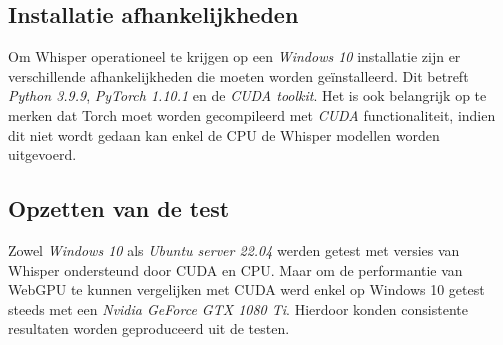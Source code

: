 \bigbreak{}

\subsection*{Installatie afhankelijkheden}

Om Whisper operationeel te krijgen op een \textit{Windows 10} installatie zijn er verschillende afhankelijkheden die moeten worden geïnstalleerd. Dit betreft \textit{Python 3.9.9}, \textit{PyTorch 1.10.1} en de \textit{CUDA toolkit}. Het is ook belangrijk op te merken dat Torch moet worden gecompileerd met \textit{CUDA} functionaliteit, indien dit niet wordt gedaan kan enkel de CPU de Whisper modellen worden uitgevoerd.

\subsection*{Opzetten van de test}

Zowel \textit{Windows 10} als \textit{Ubuntu server 22.04} werden getest met versies van Whisper ondersteund door CUDA en CPU. Maar om de performantie van WebGPU te kunnen vergelijken met CUDA werd enkel op Windows 10 getest steeds met een \textit{Nvidia GeForce GTX 1080 Ti}. Hierdoor konden consistente resultaten worden geproduceerd uit de testen.

\break{}







